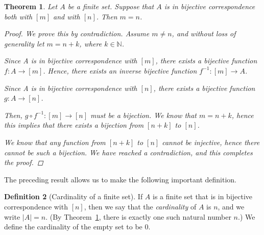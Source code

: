 \documentclass[11pt]{article}
\newcommand{\bbN}{\mathbb{N}}
\providecommand{\abs}[1]{\lvert #1 \rvert}
\newtheorem{theorem}{Theorem}[section]
\theoremstyle{definition}
\newtheorem{definition}[theorem]{Definition}
\numberwithin{equation}{subsection}
\begin{document}
\begin{theorem}  \label{bij}
Let $A$ be a finite set. Suppose that $A$ is in bijective correspondence both with $[m]$ and with $[n]$.  Then $m = n$.

\begin{proof}
We prove this by contradiction. Assume $m \not = n$, and without loss of generality let $m = n + k$, where $k \in \bbN$.

Since A is in bijective correspondence with $[m]$, there exists a bijective function $f\colon A \rightarrow [m]$. Hence, there exists an inverse bijective function $f^{-1}\colon [m] \rightarrow A$. 

Since A is in bijective correspondence with $[n]$, there exists a bijective function $g\colon A \rightarrow [n]$.

Then, $g \circ f^{-1}\colon [m] \rightarrow [n]$ must be a bijection. We know that $m = n+k$, hence this implies that there exists a bijection from $[n+k]$ to $[n]$. 

We know that any function from $[n+k]$ to $[n]$ cannot be injective, hence there cannot be such a bijection. We have reached a contradiction, and this completes the proof.


\renewcommand\qedsymbol{QED}

\end{proof}

\end{theorem}

The preceding result allows us to make the following important definition.

\begin{definition}[Cardinality of a finite set]
 If $A$ is a finite set that is in bijective correspondence with $[n]$, then we say that the \emph{cardinality} of $A$ is $n$, and we write $\abs{A} = n$.  (By   Theorem~\ref{bij}, there is exactly one such natural number $n$.) We define the cardinality of the empty set to be $0.$
\end{definition}
\end{document}
